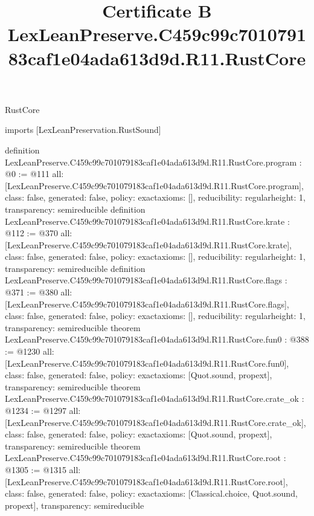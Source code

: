 \begin{lexlean}{RustCore}
\title{Certificate B LexLeanPreserve.C459c99c701079183caf1e04ada613d9d.R11.RustCore}
\begin{coremodule}
imports [LexLeanPreservation.RustSound]

definition LexLeanPreserve.C459c99c701079183caf1e04ada613d9d.R11.RustCore.program : @0 := @111 {
  all: [LexLeanPreserve.C459c99c701079183caf1e04ada613d9d.R11.RustCore.program],
  class: false,
  generated: false,
  policy: exact{axioms: []},
  reducibility: regular{height: 1},
  transparency: semireducible
}
definition LexLeanPreserve.C459c99c701079183caf1e04ada613d9d.R11.RustCore.krate : @112 := @370 {
  all: [LexLeanPreserve.C459c99c701079183caf1e04ada613d9d.R11.RustCore.krate],
  class: false,
  generated: false,
  policy: exact{axioms: []},
  reducibility: regular{height: 1},
  transparency: semireducible
}
definition LexLeanPreserve.C459c99c701079183caf1e04ada613d9d.R11.RustCore.flags : @371 := @380 {
  all: [LexLeanPreserve.C459c99c701079183caf1e04ada613d9d.R11.RustCore.flags],
  class: false,
  generated: false,
  policy: exact{axioms: []},
  reducibility: regular{height: 1},
  transparency: semireducible
}
theorem LexLeanPreserve.C459c99c701079183caf1e04ada613d9d.R11.RustCore.fun0 : @388 := @1230 {
  all: [LexLeanPreserve.C459c99c701079183caf1e04ada613d9d.R11.RustCore.fun0],
  class: false,
  generated: false,
  policy: exact{axioms: [Quot.sound, propext]},
  transparency: semireducible
}
theorem LexLeanPreserve.C459c99c701079183caf1e04ada613d9d.R11.RustCore.crate_ok : @1234 := @1297 {
  all: [LexLeanPreserve.C459c99c701079183caf1e04ada613d9d.R11.RustCore.crate_ok],
  class: false,
  generated: false,
  policy: exact{axioms: [Quot.sound, propext]},
  transparency: semireducible
}
theorem LexLeanPreserve.C459c99c701079183caf1e04ada613d9d.R11.RustCore.root : @1305 := @1315 {
  all: [LexLeanPreserve.C459c99c701079183caf1e04ada613d9d.R11.RustCore.root],
  class: false,
  generated: false,
  policy: exact{axioms: [Classical.choice, Quot.sound, propext]},
  transparency: semireducible
}


\end{coremodule}
\end{lexlean}
